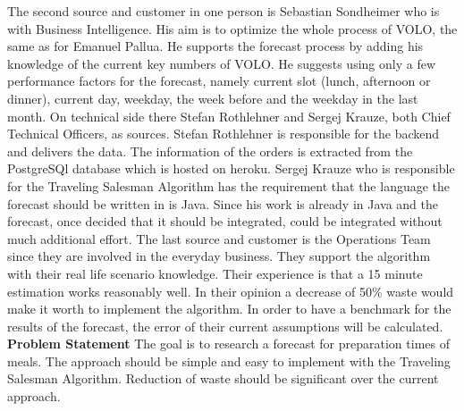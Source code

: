 The second source and customer in one person is Sebastian Sondheimer who is with Business Intelligence. His aim is to optimize the whole process of VOLO, the same as for Emanuel Pallua. He supports the forecast process by adding his knowledge of the current key numbers of VOLO. He suggests using only a few performance factors for the forecast, namely current slot (lunch, afternoon or dinner), current day, weekday, the week before and the weekday in the last month.\newline
On technical side there Stefan Rothlehner and Sergej Krauze, both Chief Technical Officers, as sources. Stefan Rothlehner is responsible for the backend and delivers the data. The information of the orders is extracted from the PostgreSQl database which is hosted on heroku. Sergej Krauze who is responsible for the Traveling Salesman Algorithm has the requirement that the language the forecast should be written in is Java. Since his work is already in Java and the forecast, once decided that it should be integrated, could be integrated without much additional effort.\newline
The last source and customer is the Operations Team since they are involved in the everyday business. They support the algorithm with their real life scenario knowledge. Their experience is that a 15 minute estimation works reasonably well. In their opinion a decrease of 50\% waste would make it worth to implement the algorithm. In order to have a benchmark for the results of the forecast, the error of their current assumptions will be calculated.
\newline\newline\textbf{Problem Statement}\newline
The goal is to research a forecast for preparation times of meals. The approach should be simple and easy to implement with the Traveling Salesman Algorithm. Reduction of waste should be significant over the current approach.
